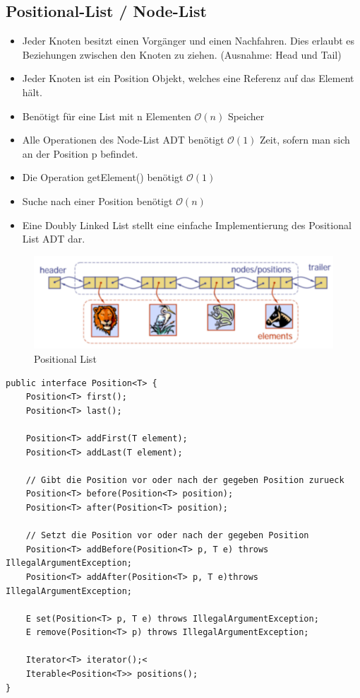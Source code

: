 \subsection{Positional-List / Node-List}
\begin{itemize}
	\item Jeder Knoten besitzt einen Vorgänger und einen Nachfahren. Dies erlaubt es Beziehungen zwischen den Knoten zu ziehen. (Ausnahme: Head und Tail)
	\item Jeder Knoten ist ein Position Objekt, welches eine Referenz auf das Element hält.
	\item Benötigt für eine List mit n Elementen $\mathcal{O}(n)$ Speicher
	\item Alle Operationen des Node-List ADT benötigt $\mathcal{O}(1)$ Zeit, sofern man sich an der Position p befindet. 
	\item Die Operation getElement() benötigt $\mathcal{O}(1)$
	\item Suche nach einer Position benötigt $\mathcal{O}(n)$
	\item Eine Doubly Linked List stellt eine einfache Implementierung des Positional List ADT dar.
\end{itemize}
\begin{figure}[h!]
	\centering
	\includegraphics[width=0.7\linewidth]{images/positional_list}
	\caption{Positional List}
\end{figure}
\begin{lstlisting}
public interface Position<T> {
	Position<T> first();
	Position<T> last();
	
	Position<T> addFirst(T element);
	Position<T> addLast(T element);
	
	// Gibt die Position vor oder nach der gegeben Position zurueck
	Position<T> before(Position<T> position);
	Position<T> after(Position<T> position);
	
	// Setzt die Position vor oder nach der gegeben Position
	Position<T> addBefore(Position<T> p, T e) throws IllegalArgumentException;
	Position<T> addAfter(Position<T> p, T e)throws IllegalArgumentException;
	
	E set(Position<T> p, T e) throws IllegalArgumentException;
	E remove(Position<T> p) throws IllegalArgumentException;
	
	Iterator<T> iterator();<
	Iterable<Position<T>> positions();
}
\end{lstlisting}



